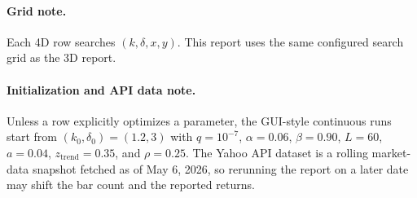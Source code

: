 \documentclass[10pt]{article}
\begin{document}
\paragraph{Grid note.}
Each 4D row searches $(k,\delta,x,y)$. This report uses the same configured
search grid as the 3D report.

\paragraph{Initialization and API data note.}
Unless a row explicitly optimizes a parameter, the GUI-style continuous runs
start from $(k_0,\delta_0)=(1.2,3)$ with
$q=10^{-7}$, $\alpha=0.06$, $\beta=0.90$, $L=60$, $a=0.04$,
$z_{\mathrm{trend}}=0.35$, and $\rho=0.25$. The Yahoo API dataset is a rolling
market-data snapshot fetched as of May 6, 2026, so rerunning the report on a
later date may shift the bar count and the reported returns.
\end{document}
